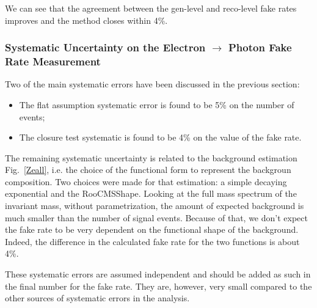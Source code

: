 

We can see that the agreement between the gen-level and reco-level fake rates improves and the method closes within 4\%.

\subsubsection{Systematic Uncertainty on the Electron $\rightarrow$ Photon Fake Rate Measurement}
Two of the main systematic errors have been discussed in the previous section:

\begin{itemize}
\item The flat assumption systematic error is found to be 5\% on the number of events;
\item The closure test systematic is found to be 4\% on the value of the fake rate.
\end{itemize}

The remaining systematic uncertainty is related to the background estimation Fig.~\ref{Zeall}, i.e. the choice of the functional form to represent the backgroun composition. Two choices were made for that estimation: a simple decaying exponential and the RooCMSShape. Looking at the full mass spectrum of the invariant mass, without parametrization, the amount of expected background is much smaller than the number of signal events. Because of that, we don't expect the fake rate to be very dependent on the functional shape of the background. Indeed, the difference in the calculated fake rate for the two functions is about 4\%.

These systematic errors are assumed independent and should be added as such in the final number for the fake rate. They are, however, very small compared to the other sources of systematic errors in the analysis.
